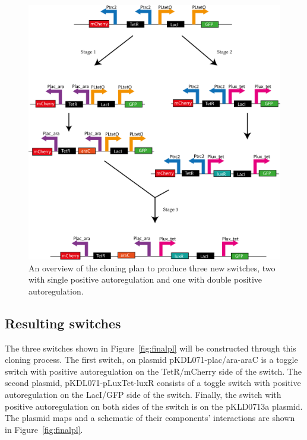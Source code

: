\begin{figure}[t]
	\begin{center}
		\includegraphics[scale=0.7]{../../chapters/chapterDesignSwitches/images/switches_cloning_big.png}
		\caption[Cloning plan overview]{\label{fig:plan}An overview of the cloning plan to produce three new switches, two with single positive autoregulation and one with double positive autoregulation.}
	\end{center}
\end{figure}
\clearpage

\subsection{Resulting switches}
The three switches shown in Figure~\ref{fig:finalpl} will be constructed through this cloning process. The first switch, on plasmid pKDL071-plac/ara-araC is a toggle switch with positive autoregulation on the TetR/mCherry side of the switch. The second plasmid, pKDL071-pLuxTet-luxR consists of a toggle switch with positive autoregulation on the LacI/GFP side of the switch. Finally, the switch with positive autoregulation on both sides of the switch is on the pKLD0713a plasmid. The plasmid maps and a schematic of their components' interactions are shown in Figure~\ref{fig:finalpl}. 

